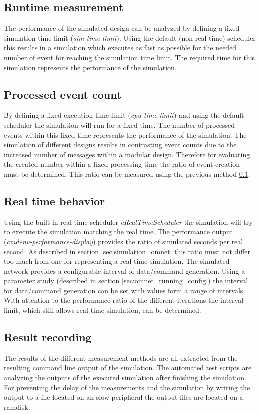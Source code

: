 \subsection{Runtime measurement}
\label{sec:measurements_methods_runtime}
The performance of the simulated design can be analyzed by defining a fixed simulation time limit (\emph{sim-time-limit}).
Using the default (non real-time) scheduler this results in a simulation which executes as fast as possible for the needed number of event for reaching the simulation time limit.
The required time for this simulation represents the performance of the simulation.

\subsection{Processed event count}
\label{sec:measurements_methods_event}
By defining a fixed execution time limit (\emph{cpu-time-limit}) and using the default scheduler the simulation will run for a fixed time.
The number of processed events within this fixed time represents the performance of the simulation.
The simulation of different designs results in contrasting event counts due to the increased number of messages within a modular design.
Therefore for evaluating the created number within a fixed processing time the ratio of event creation must be determined.
This ratio can be measured using the previous method \ref{sec:measurements_methods_runtime}.

\subsection{Real time behavior}
\label{sec:measurements_methods_realtime}
Using the built in real time scheduler \emph{cRealTimeScheduler} the simulation will try to execute the simulation matching the real time.
The performance output (\emph{cmdenv-performance-display}) provides the ratio of simulated seconds per real second.
As described in section \ref{sec:simulation_omnet} this ratio must not differ too much from one for representing a real-time simulation.
The simulated network provides a configurable interval of data/command generation.
Using a parameter study (described in section \ref{sec:omnet_running_config}) the interval for data/command generation can be set with values form a range of intervals.
With attention to the performance ratio of the different iterations the interval limit, which still allows real-time simulation, can be determined.

\subsection{Result recording}
The results of the different measurement methods are all extracted from the resulting command line output of the simulation.
The automated test scripts are analyzing the outputs of the executed simulation after finishing the simulation.
For preventing the delay of the measurements and the simulation by writing the output to a file located on an slow peripheral the output files are located on a ramdisk.

